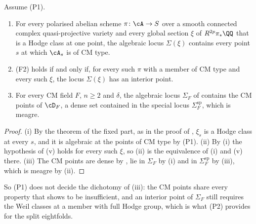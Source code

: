 \begin{corollary}\label{cor:f2cm}
Assume \textup{(P1)}.
\begin{enumerate}[label=\textup{(\roman*)},leftmargin=2.6em,itemsep=2pt]
\item For every polarised abelian scheme $\pi\colon\cA\to S$ over a smooth
  connected complex quasi-projective variety and every global section $\xi$
  of $R^{2p}\pi_{*}\QQ$ that is a Hodge class at one point, the algebraic
  locus $\Sigma(\xi)$ contains every point $s$ at which $\cA_{s}$ is of CM
  type.
\item \textup{(F2)} holds if and only if, for every such $\pi$ with a member
  of CM type and every such $\xi$, the locus $\Sigma(\xi)$ has an interior
  point.
\item For every CM field $F$, $n\ge2$ and $\delta$, the algebraic locus
  $\Sigma_{F}$ of  contains the CM points of $\cD_{F}$, a dense
  set contained in the special locus $\Sigma^{\mathrm{sp}}_{F}$, which is
  meagre.
\end{enumerate}
\end{corollary}

\begin{proof}
(i) By the theorem of the fixed part, as in the proof of
, $\xi_{s}$ is a Hodge class at every $s$, and it is
algebraic at the points of CM type by (P1). (ii) By (i) the hypothesis of
(v) holds for every such $\xi$, so (ii) is the
equivalence of (i) and (v) there. (iii) The CM points are dense by
, lie in $\Sigma_{F}$ by (i) and in
$\Sigma^{\mathrm{sp}}_{F}$ by (iii), which is meagre
by (ii).
\end{proof}

So (P1) does not decide the dichotomy of (iii): the CM points
share every property that  shows to be insufficient, and an
interior point of $\Sigma_{F}$ still requires the Weil classes at a member
with full Hodge group, which is what (P2) provides for the split eightfolds.

